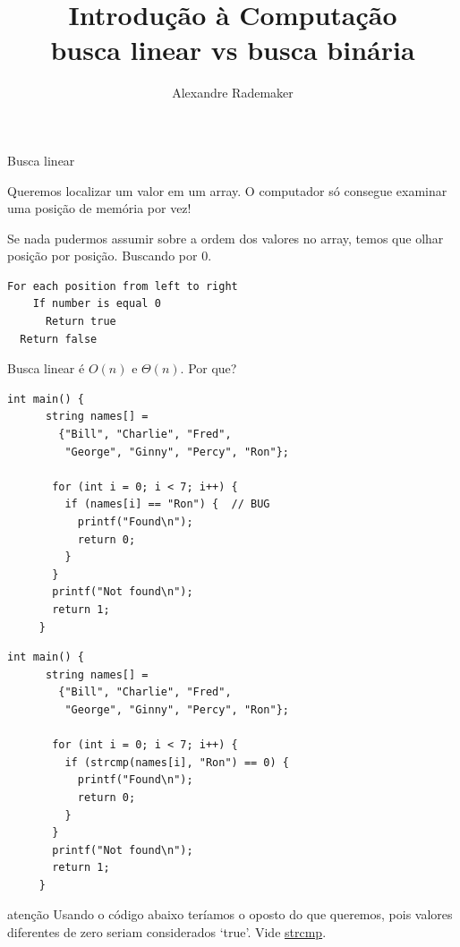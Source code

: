 \documentclass{beamer}
\title{Introdução à Computação \\ busca linear vs busca binária}
\author{Alexandre Rademaker}
\date{}
\begin{document}
\begin{frame}
 \maketitle
\end{frame}


\begin{frame}{Busca linear}

  Queremos localizar um valor em um array. O computador só consegue
  examinar uma posição de memória por vez!

  Se nada pudermos assumir sobre a ordem dos valores no array, temos
  que olhar posição por posição. Buscando por 0.

  \begin{lstlisting}[basicstyle=\ttfamily]
  For each position from left to right
    If number is equal 0
      Return true
  Return false  
  \end{lstlisting}

  Busca linear é $O(n)$ e $\Theta(n)$. Por que?

  \framebreak

  

  \framebreak

  \begin{lstlisting}[style=normalc,caption=names0.c]
    int main() {
      string names[] =
        {"Bill", "Charlie", "Fred",
         "George", "Ginny", "Percy", "Ron"};
  
       for (int i = 0; i < 7; i++) {
         if (names[i] == "Ron") {  // BUG
           printf("Found\n");
           return 0;
         }
       }
       printf("Not found\n");
       return 1;
     }
  \end{lstlisting}

  \framebreak

  \begin{lstlisting}[style=normalc,caption=names1.c]
    int main() {
      string names[] =
        {"Bill", "Charlie", "Fred",
         "George", "Ginny", "Percy", "Ron"};
      
       for (int i = 0; i < 7; i++) {
         if (strcmp(names[i], "Ron") == 0) {
           printf("Found\n");
           return 0;
         }
       }
       printf("Not found\n");
       return 1;
     }
  \end{lstlisting}

  \framebreak

  {\color{red} atenção} Usando o código abaixo teríamos o oposto do
  que queremos, pois valores diferentes de zero seriam considerados
  `true'. Vide \href{https://man7.org/linux/man-pages/man3/strcmp.3.html}{strcmp}.


\end{frame}
\end{document}
